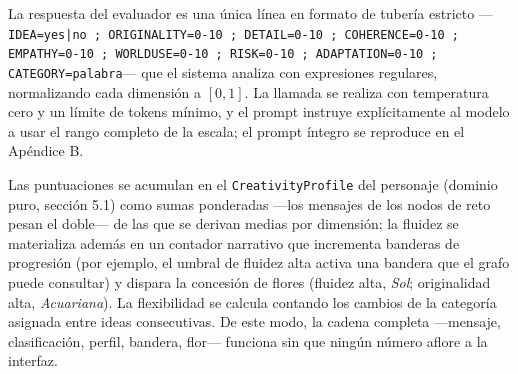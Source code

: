 \documentclass[12pt,twoside,titlepage]{report}
\begin{document}
\begin{sloppypar}
La respuesta del evaluador es una única línea en formato de tubería estricto ---\texttt{IDEA=yes|no ; ORIGINALITY=0-10 ; DETAIL=0-10 ; COHERENCE=0-10 ; EMPATHY=0-10 ; WORLDUSE=0-10 ; RISK=0-10 ; ADAPTATION=0-10 ; CATEGORY=palabra}--- que el sistema analiza con expresiones regulares, normalizando cada dimensión a $[0,1]$. La llamada se realiza con temperatura cero y un límite de tokens mínimo, y el prompt instruye explícitamente al modelo a usar el rango completo de la escala; el prompt íntegro se reproduce en el Apéndice B. 
\end{sloppypar}


Las puntuaciones se acumulan en el \texttt{CreativityProfile} del personaje (dominio puro, sección 5.1) como sumas ponderadas ---los mensajes de los nodos de reto pesan el doble--- de las que se derivan medias por dimensión; la fluidez se materializa además en un contador narrativo que incrementa banderas de progresión (por ejemplo, el umbral de fluidez alta activa una bandera que el grafo puede consultar) y dispara la concesión de flores (fluidez alta, \textit{Sol}; originalidad alta, \textit{Acuariana}). La flexibilidad se calcula contando los cambios de la categoría asignada entre ideas consecutivas. De este modo, la cadena completa ---mensaje, clasificación, perfil, bandera, flor--- funciona sin que ningún número aflore a la interfaz.
\end{document}
